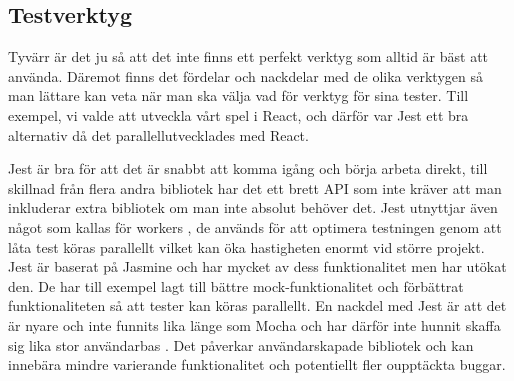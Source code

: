 \subsection{Testverktyg}
Tyvärr är det ju så att det inte finns ett perfekt verktyg som alltid är bäst att använda. Däremot finns det fördelar och nackdelar med de olika verktygen så man lättare kan veta när man ska välja vad för verktyg för sina tester. Till exempel, vi valde att utveckla vårt spel i React, och därför var Jest ett bra alternativ då det parallellutvecklades med React. 

Jest är bra för att det är snabbt att komma igång och börja arbeta direkt, till skillnad från flera andra bibliotek har det ett brett API som inte kräver att man inkluderar extra bibliotek om man inte absolut behöver det. Jest utnyttjar även något som kallas för workers \cite{bib-jest-worker}, de används för att optimera testningen genom att låta test köras parallellt vilket kan öka hastigheten enormt vid större projekt. Jest är baserat på Jasmine och har mycket av dess funktionalitet men har utökat den. De har till exempel lagt till bättre mock-funktionalitet och förbättrat funktionaliteten så att tester kan köras parallellt. En nackdel med Jest är att det är nyare och inte funnits lika länge som Mocha och har därför inte hunnit skaffa sig lika stor användarbas \cite{bib-jest-weakness}. Det påverkar användarskapade bibliotek och kan innebära mindre varierande funktionalitet och potentiellt fler oupptäckta buggar. 